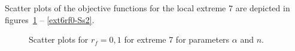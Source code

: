 \documentclass[review]{elsarticle}
\begin{document}
Scatter plots of the objective functions for the local extreme 7 are depicted in figures~\ref{ext6rf0-an2} -- \ref{ext6rf0-Ss2}.

\begin{figure}[htb!]
\label{ext6rf0-an2}
\caption{Scatter plots for $r_f=0,1$ for extreme 7 for parameters $\alpha$ and $n$.}
\end{figure}
\end{document}
